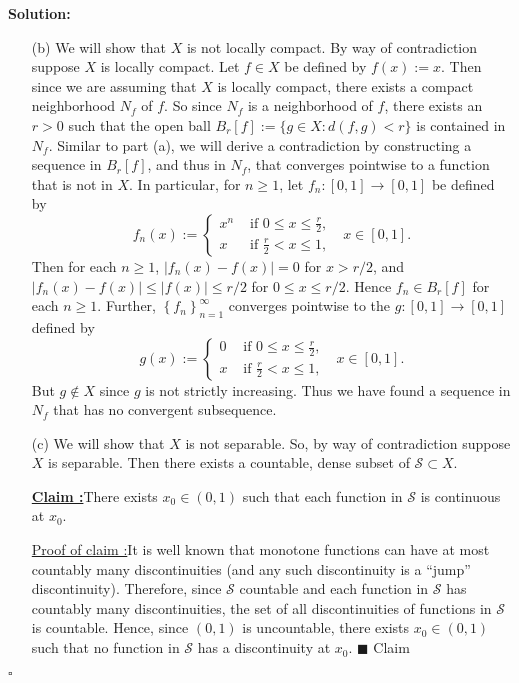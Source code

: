 \documentclass[12pt]{article}
\newcounter{ProofCounter}
\newcounter{ClaimCounter}[ProofCounter]
\newenvironment{Solution}{\stepcounter{ProofCounter}\textbf{Solution:}}{\hfill$\square$}
\newenvironment{claim}[1]{\vspace{1mm}\stepcounter{ClaimCounter}\par\noindent\underline{\bf Claim \theClaimCounter:}\space#1}{}
\newenvironment{claimproof}[1]{\par\noindent\underline{Proof of claim \theClaimCounter:}\space#1}{\hfill $\blacksquare$ Claim \theClaimCounter}
\begin{document}
\begin{Solution}
\begin{enumerate}
    \item[(b)] We will show that $X$ is not locally compact. By way of contradiction suppose $X$ is locally compact. Let $f \in X$ be defined by
      $f(x) := x$. Then since we are assuming that $X$ is locally compact, there exists a compact neighborhood $N_f$ of $f$. So since
      $N_f$ is a neighborhood of $f$, there exists an $r > 0$ such that the open ball $B_r[f] := \{ g\in X : d(f,g) < r\}$ is contained in
      $N_f$. Similar to part (a), we will derive a contradiction by constructing a sequence in $B_r[f]$, and thus in $N_f$, that converges pointwise to a
      function that is not in $X$. In particular, for $n \geq 1$, let $f_n:[0,1]\rightarrow[0,1]$ be defined by 
      \[
        f_n(x) := \left\{ \begin{array}{cl} 
            x^n & \text{ if } 0 \leq x \leq \frac{r}{2}, \\
            x & \text{ if } \frac{r}{2} < x \leq 1,
          \end{array}
        \right. \ \ \ x \in [0,1].
      \]
      Then for each $n \geq 1$, $|f_n(x) - f(x)| = 0$ for $x > r / 2$, and $|f_n(x) - f(x)| \leq |f(x)| \leq r / 2$ for $0 \leq x \leq r/2$. Hence
      $f_n \in B_r[f]$ for each $n \geq 1$. Further, $\left\{ f_n \right\}_{n=1}^{\infty}$ converges pointwise to the $g : [0,1] \rightarrow [0,1]$ defined
      by 
      \[
        g(x) := \left\{ \begin{array}{cl}
            0 & \text{ if } 0 \leq x \leq \frac{r}{2}, \\
            x & \text{ if } \frac{r}{2} < x \leq 1, 
          \end{array}
        \right. \ \ \ x \in [0,1].
      \]
      But $g \notin X$ since $g$ is not strictly increasing. Thus we have found a sequence in $N_f$ that has no convergent subsequence.


    \item[(c)] We will show that $X$ is not separable. So, by way of contradiction suppose $X$ is separable. Then there exists a countable, dense
      subset of $\mathcal{S} \subset X$. 

      \begin{claim}
        There exists $x_0 \in (0,1)$ such that each function in $\mathcal{S}$ is continuous at $x_0$.
      \end{claim}
      \begin{claimproof}
        It is well known that monotone functions can have at most countably many discontinuities (and any such
        discontinuity is a ``jump'' discontinuity). Therefore, since $\mathcal{S}$ countable and each function in $\mathcal{S}$ has countably many
        discontinuities, the set of all discontinuities of functions in $\mathcal{S}$ is countable. Hence, since $(0,1)$ is uncountable, there
        exists $x_0 \in (0,1)$ such that no function in $\mathcal{S}$ has a discontinuity at $x_0$.
      \end{claimproof}


\end{enumerate}
\end{Solution}
\end{document}
